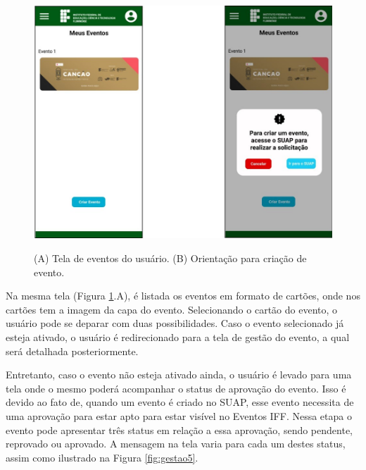 \begin{figure}[H]
    \centering
    \caption{(A) Tela de eventos do usuário. (B) Orientação para criação de evento.}
    \includegraphics[scale=0.63]{figuras/Gestao/2-3.jpg}
    \label{fig:gestao2}
\end{figure}

Na mesma tela (Figura \ref{fig:gestao2}.A), é listada os eventos em formato de cartões, onde nos cartões tem a imagem da capa do evento. Selecionando o cartão do evento, o usuário pode se deparar com duas possibilidades. Caso o evento selecionado já esteja ativado, o usuário é redirecionado para a tela de gestão do evento, a qual será detalhada posteriormente.

Entretanto, caso o evento não esteja ativado ainda, o usuário é levado para uma tela onde o mesmo poderá acompanhar o status de aprovação do evento. Isso é devido ao fato de, quando um evento é criado no SUAP, esse evento necessita de uma aprovação para estar apto para estar visível no Eventos IFF. Nessa etapa o evento pode apresentar três status em relação a essa aprovação, sendo pendente, reprovado ou aprovado. A mensagem na tela varia para cada um destes status, assim como ilustrado na Figura \ref{fig:gestao5}.

